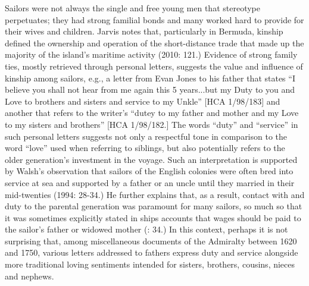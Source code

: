   Sailors were not always the single and free young men that stereotype perpetuates; they had strong familial bonds and many worked hard to provide for their wives and children. Jarvis notes that, particularly in Bermuda, kinship defined the ownership and operation of the short-distance trade that made up the majority of the island’s maritime activity (2010: 121.) Evidence of strong family ties, mostly retrieved through personal letters, suggests the value and influence of kinship among sailors, e.g., a letter from Evan Jones to his father that states “I believe you shall not hear from me again this 5 years...but my Duty to you and Love to brothers and sisters and service to my Unkle” [HCA 1/98/183] and another that refers to the writer’s “dutey to my father and mother and my Love to my sisters and brothers” [HCA 1/98/182.] The words “duty” and “service” in such personal letters suggests not only a respectful tone in comparison to the word “love” used when referring to siblings, but also potentially refers to the older generation’s investment in the voyage. Such an interpretation is supported by Walsh’s observation that sailors of the English colonies were often bred into service at sea and supported by a father or an uncle until they married in their mid-twenties (1994: 28-34.) He further explains that, as a result, contact with and duty to the parental generation was paramount for many sailors, so much so that it was sometimes explicitly stated in ships accounts that wages should be paid to the sailor’s father or widowed mother (\citealt{Walsh1994}: 34.) In this context, perhaps it is not surprising that, among miscellaneous documents of the Admiralty between 1620 and 1750, various letters addressed to fathers express duty and service alongside more traditional loving sentiments intended for sisters, brothers, cousins, nieces and nephews.  

